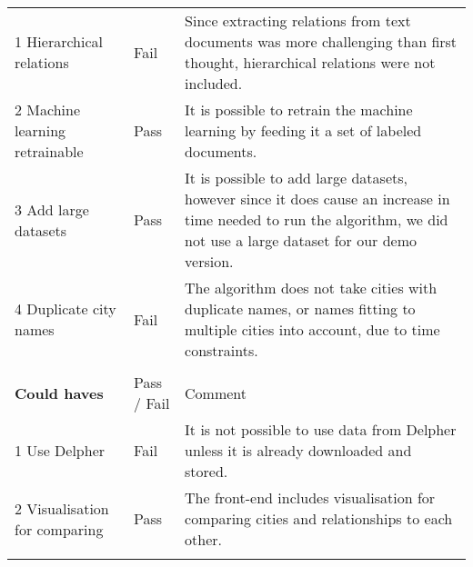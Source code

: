\begin{table}[]
\begin{tabular}{ll m{8cm}}
1 Hierarchical relations       & Fail        & Since extracting relations from text documents was more challenging than first thought, hierarchical relations were not included.                                                         \\
2 Machine learning retrainable & Pass        & It is possible to retrain the machine learning by feeding it a set of labeled documents.                                                                                                                                              \\
3 Add large datasets           & Pass        & It is possible to add large  datasets, however since it does cause an increase in time needed to run the algorithm, we did not use a large dataset for our demo version.                     \\
4 Duplicate city names         & Fail        & The algorithm does not take cities with duplicate names, or names fitting to multiple cities into account, due to time constraints.                                                         \\
                               &             &                                                                                                                                                                                                                                       \\
\textbf{Could haves}                    & Pass / Fail & Comment                                                                                                                                                                                                                               \\
1 Use Delpher                  & Fail        & It is not possible to use data from Delpher unless it is already downloaded and stored.                                                                                                                                               \\
2 Visualisation for comparing  & Pass        & The front-end includes visualisation for comparing cities and relationships to each other.                                                                                                                                            \\
                               &             &                                                                                                                                                                                                                                       \\

\end{tabular}
\end{table}
